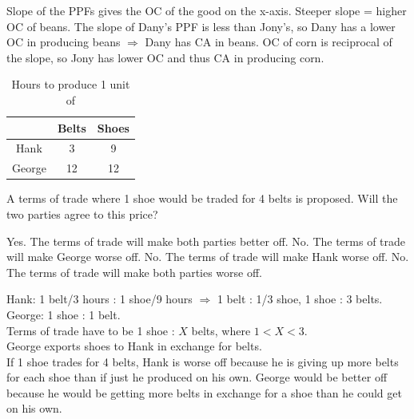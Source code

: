 \documentclass[addpoints,11pt]{exam}
\theoremstyle{definition}
\begin{document}
\begin{questions}
			\begin{solution}
				Slope of the PPFs gives the OC of the good on the x-axis. Steeper slope = higher OC of beans. The slope of Dany's PPF is less than Jony's, so Dany has a lower OC in producing beans $\Rightarrow$ Dany has CA in beans. OC of corn is reciprocal of the slope, so Jony has lower OC and thus CA in producing corn.
			\end{solution}
			
		
\newpage


\begin{table}[ht]
	\caption{Hours to produce 1 unit of}
	\centering
	\begin{tabular}{  c| c c} 
		
		& Belts & Shoes \\
		\hline
		Hank & 3 & 9 \\
		George & 12 & 12 \\
	\end{tabular}
	\label{MC8}
\end{table}



\question \label{blah5} A terms of trade where 1 shoe would be traded for 4 belts is proposed. Will the two parties agree to this price?

\begin{choices}
	\choice Yes. The terms of trade will make both parties better off.
	\choice No. The terms of trade will make George worse off.
	\CorrectChoice No. The terms of trade will make Hank worse off.
	\choice No. The terms of trade will make both parties worse off.
\end{choices}

\begin{solution}
	Hank: 1 belt/3 hours : 1 shoe/9 hours $\Rightarrow$ 1 belt : 1/3 shoe, 1 shoe : 3 belts. \\
	George: 1 shoe : 1 belt. \\
	Terms of trade have to be 1 shoe : $X$ belts, where $1<X<3$. \\
	George exports shoes to Hank in exchange for belts. \\
	If 1 shoe trades for 4 belts, Hank is worse off because he is giving up more belts for each shoe than if just he produced on his own. George would be better off because he would be getting more belts in exchange for a shoe than he could get on his own.
\end{solution}


\end{questions}
\end{document}
